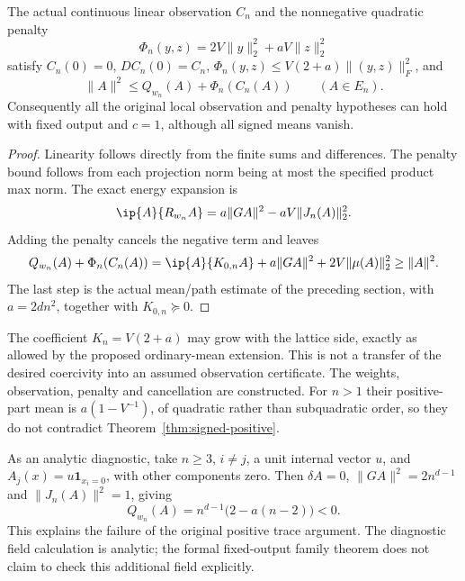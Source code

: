 \begin{proposition}\label{prop:signed-zero}
The actual continuous linear observation $C_n$ and the nonnegative
quadratic penalty
\[
 \Phi_n(y,z)=2V\|y\|_2^2+aV\|z\|_2^2
\]
satisfy $C_n(0)=0$, $DC_n(0)=C_n$,
$\Phi_n(y,z)\leq V(2+a)\|(y,z)\|_F^2$, and
\[
 \|A\|^2\leq Q_{w_n}(A)+\Phi_n(C_n(A))\qquad(A\in E_n).
\]
Consequently all the original local observation and penalty hypotheses
can hold with fixed output and $c=1$, although all signed means vanish.
\end{proposition}
\begin{proof}
Linearity follows directly from the finite sums and differences. The
penalty bound follows from each projection norm being at most the
specified product max norm. The exact energy expansion is
\[
 \ip{A}{R_{w_n}A}=a\|GA\|^2-aV\|J_n(A)\|_2^2.
\]
Adding the penalty cancels the negative term and leaves
\[
 Q_{w_n}(A)+\Phi_n(C_n(A))
   =\ip{A}{K_{0,n}A}+a\|GA\|^2+2V\|\mu(A)\|_2^2
   \geq\|A\|^2.
\]
The last step is the actual mean/path estimate of the preceding section,
with $a=2dn^2$, together with $K_{0,n}\succeq0$.
\end{proof}
The coefficient $K_n=V(2+a)$ may grow with the lattice side, exactly as
allowed by the proposed ordinary-mean extension. This is not a transfer
of the desired coercivity into an assumed observation certificate.
The weights, observation, penalty and cancellation are constructed.
For $n>1$ their positive-part mean is $a(1-V^{-1})$, of quadratic rather
than subquadratic order, so they do not contradict
Theorem~\ref{thm:signed-positive}.

As an analytic diagnostic, take $n\geq3$, $i\ne j$, a unit internal vector
$u$, and $A_j(x)=u\mathbf1_{x_i=0}$, with other components zero. Then
$\delta A=0$, $\|GA\|^2=2n^{d-1}$ and $\|J_n(A)\|^2=1$, giving
\[
 Q_{w_n}(A)=n^{d-1}\bigl(2-a(n-2)\bigr)<0.
\]
This explains the failure of the original positive trace argument.
The diagnostic field calculation is analytic; the formal fixed-output
family theorem does not claim to check this additional field explicitly.

